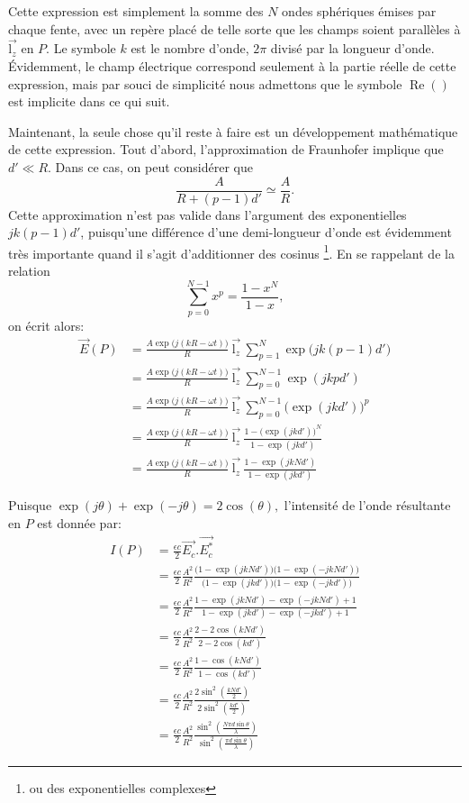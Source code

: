 Cette expression est simplement la somme des $N$ ondes sphériques émises par chaque fente, avec un repère placé de telle sorte que les champs soient parallèles à $\overset\rightarrow{\mbox{l}_z}$ en $P$. Le symbole $k$ est le nombre d'onde, $2\pi$ divisé par la longueur d'onde. Évidemment, le champ électrique correspond seulement à la partie réelle de cette expression, mais par souci de simplicité nous admettons que le symbole $\operatorname{Re}()$ est implicite dans ce qui suit.

Maintenant, la seule chose qu'il reste à faire est un développement mathématique de cette expression. Tout d'abord, l'approximation de Fraunhofer implique que $d' \ll R$. Dans ce cas, on peut considérer que 
$$\frac{A}{R+(p-1)d'} \simeq \frac{A}{R}.$$ 
Cette approximation n'est pas valide dans l'argument des exponentielles $jk(p-1)d' $, puisqu'une différence d'une demi-longueur d'onde est évidemment très importante quand il s'agit d'additionner des cosinus \footnote{ou des exponentielles complexes}. 
En se rappelant de la relation
$$\sum\limits_{p=0}^{N-1} x^p=\frac{1-x^N}{1-x}, $$
on écrit alors:
\begin{align*}
\overset\rightarrow{E}(P) & = \frac{A\exp\Big(j(kR-\omega t)\Big)}{R}\:\overset\rightarrow{\mbox{l}_z}\: \sum\limits_{p=1}^N \exp\Big(jk(p-1)d'\Big) \\
& =\frac{A\exp\Big(j(kR-\omega t)\Big)}{R}\:\overset\rightarrow{\mbox{l}_z}\: \sum\limits_{p=0}^{N-1} \exp(jkpd') \\
& = \frac{A\exp\Big(j(kR-\omega t)\Big)}{R}\:\overset\rightarrow{\mbox{l}_z}\: \sum\limits_{p=0}^{N-1} {\Big(\exp(jkd')\Big)}^{p} \\
& = \frac{A\exp\Big(j(kR-\omega t)\Big)}{R}\:\overset\rightarrow{\mbox{l}_z}\: 
\frac{1-{\Big(\exp(jkd')\Big)}^N}{1-\exp(jkd')}\\
& = \frac{A\exp\Big(j(kR-\omega t)\Big)}{R}\:\overset\rightarrow{\mbox{l}_z}\: 
\frac{1-\exp(jkNd')}{1-\exp(jkd')}
\end{align*}

Puisque $\exp(j\theta)+\exp(-j\theta)= 2\cos(\theta),$ l'intensité de l'onde résultante en $P$ est donnée par:
\begin{align*}
I(P) & =\frac{\epsilon c}{2}\overset\rightarrow{E_c}.\overset\rightarrow{E_c^*} \\
& = \frac{\epsilon c}{2}\frac{A^2}{R^2}\frac{\Big(1-\exp(jkNd')\Big)\Big(1-\exp(-jkNd')\Big)}{\Big(1-\exp(jkd')\Big)\Big(1-\exp(-jkd')\Big)}\\
& = \frac{\epsilon c}{2}\frac{A^2}{R^2}\frac{1-\exp(jkNd')-\exp(-jkNd')+1}{1-\exp(jkd')-\exp(-jkd')+1}\\
& = \frac{\epsilon c}{2}\frac{A^2}{R^2}\frac{2-2\cos(kNd')}{2-2\cos(kd')}\\
& = \frac{\epsilon c}{2}\frac{A^2}{R^2}\frac{1-\cos(kNd')}{1-\cos(kd')}\\
& = \frac{\epsilon c}{2}\frac{A^2}{R^2}\frac{2\sin^2(\frac{kNd'}{2})}{2\sin^2(\frac{kd'}{2})}\\
& = \frac{\epsilon c}{2}\frac{A^2}{R^2}\frac{\sin^2(\frac{N\pi d\sin\theta}{\lambda})}{\sin^2(\frac{\pi d\sin\theta}{\lambda})}
\end{align*}

